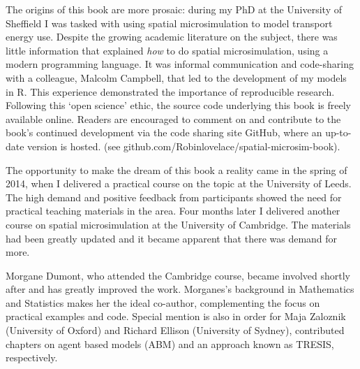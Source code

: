 The origins of this book are more prosaic: during my PhD at the University of Sheffield
I was tasked with using spatial microsimulation to model transport energy use.
Despite the growing academic literature on the subject,
there was little information that explained \emph{how} to do spatial microsimulation,
using a modern programming language.
It was informal communication and code-sharing with a colleague,
Malcolm Campbell, that led to the development of my models in R.
This experience demonstrated the importance of
reproducible research. Following this `open science' ethic,
the source code underlying this book is freely
available online. Readers are encouraged to comment on and contribute to
the book's continued development via the code sharing site GitHub, where
an up-to-date version is hosted.
(see github.com/Robinlovelace/spatial-microsim-book).

The opportunity to make the dream of this book a reality came in the spring
of 2014, when I delivered a practical course on the topic at
the University of Leeds.
The high demand and positive feedback from participants
showed the need for practical teaching materials in the area.
Four months later
I delivered another course on spatial microsimulation
at the University of Cambridge.
The materials had been greatly updated
and it became apparent that there was demand for more.

Morgane Dumont, who attended the Cambridge course,
became involved shortly after and has greatly improved the work.
Morganes's background in Mathematics and Statistics makes her the
ideal co-author, complementing the focus on practical examples
and code. Special mention is also in order for Maja Zaloznik
(University of Oxford)
and Richard Ellison (University of Sydney),
contributed chapters on
agent based models (ABM) and an approach known as TRESIS, respectively.

